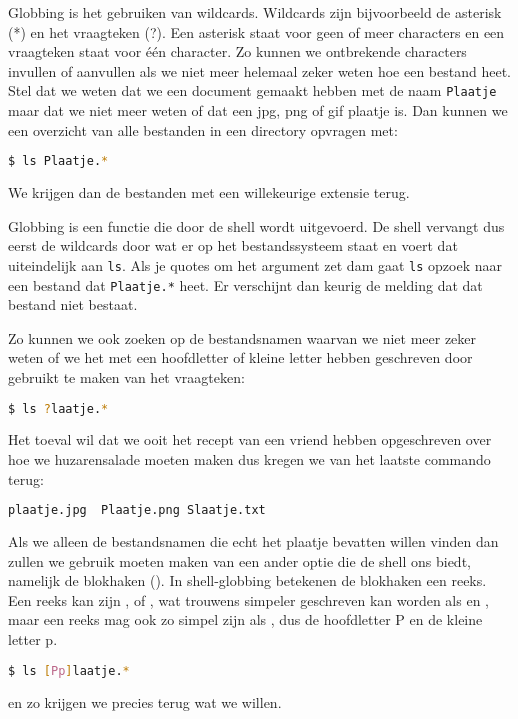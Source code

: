 Globbing is het gebruiken van wildcards. Wildcards zijn bijvoorbeeld de asterisk (*) en het vraagteken (?). Een asterisk staat voor geen of meer characters en een vraagteken staat voor \'{e}\'{e}n character. Zo kunnen we ontbrekende characters invullen of aanvullen als we niet meer helemaal zeker weten hoe een bestand heet. Stel dat we weten dat we een document gemaakt hebben met de naam \texttt{Plaatje} maar dat we niet meer weten of dat een jpg, png of gif plaatje is. Dan kunnen we een overzicht van alle bestanden in een directory opvragen met:
\begin{lstlisting}[language=bash]
$ ls Plaatje.*
\end{lstlisting}
We krijgen dan de bestanden met een willekeurige extensie terug.

Globbing is een functie die door de shell wordt uitgevoerd. De shell vervangt dus eerst de wildcards door wat er op het bestandssysteem staat en voert dat uiteindelijk aan \texttt{ls}. Als je quotes om het argument zet dam gaat \texttt{ls} opzoek naar een bestand dat \verb|Plaatje.*| heet. Er verschijnt dan keurig de melding dat dat bestand niet bestaat.

Zo kunnen we ook zoeken op de bestandsnamen waarvan we niet meer zeker weten of we het met een hoofdletter of kleine letter hebben geschreven door gebruikt te maken van het vraagteken:
\begin{lstlisting}[language=bash]
$ ls ?laatje.*
\end{lstlisting}

Het toeval wil dat we ooit het recept van een vriend hebben opgeschreven over hoe we huzarensalade moeten maken dus kregen we van het laatste commando terug:
\begin{lstlisting}[language=bash]
plaatje.jpg  Plaatje.png Slaatje.txt
\end{lstlisting}

Als we alleen de bestandsnamen die echt het plaatje bevatten willen vinden dan zullen we gebruik moeten maken van een ander optie die de shell ons biedt, namelijk de blokhaken (\big[\big]). In shell-globbing betekenen de blokhaken een reeks. Een reeks kan zijn \big[1234567890\big], of , wat trouwens simpeler geschreven kan worden als \big[0-9\big] en \big[a-g\big], maar een reeks mag ook zo simpel zijn als \big[pP\big], dus de hoofdletter P en de kleine letter p.
\begin{lstlisting}[language=bash]
$ ls [Pp]laatje.*
\end{lstlisting}
en zo krijgen we precies terug wat we willen.

